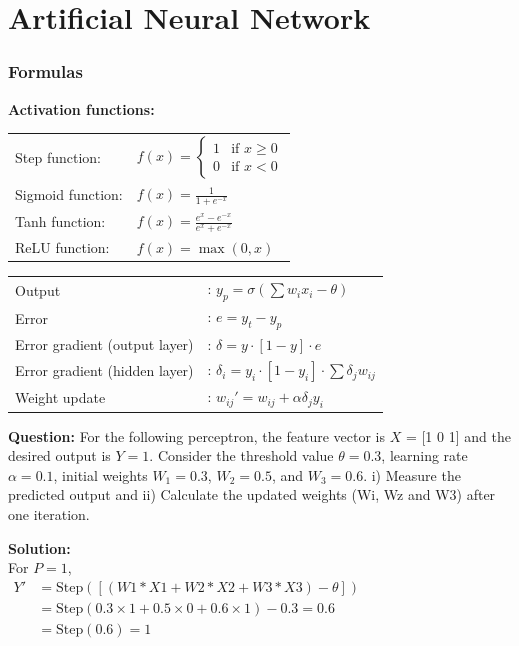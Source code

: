 \chapter{Artificial Neural Network}

\subsection*{Formulas}

\textbf{Activation functions:}\\[0.5em]
\begin{tabular}{ll}
   Step function: & $f(x) = \begin{cases} 1 & \text{if } x \geq 0 \\ 0 & \text{if } x < 0 \end{cases}$ \\[0.5em]
   Sigmoid function: & $f(x) = \frac{1}{1 + e^{-x}}$ \\[0.5em]
   Tanh function: & $f(x) = \frac{e^x - e^{-x}}{e^x + e^{-x}}$ \\[0.5em]
   ReLU function: & $f(x) = \max(0, x)$ \\[0.5em]
\end{tabular}


\begin{tabular}{ll}
   Output &: $y_p = \sigma\left(\sum w_i x_i - \theta\right)$ \\
   Error &: $e = y_t - y_p$ \\
   Error gradient (output layer) &: $\delta = y \cdot [1-y] \cdot e$ \\
   Error gradient (hidden layer) &: $\delta_i = y_i \cdot [1-y_i] \cdot \sum \delta_j w_{ij}$ \\
   Weight update &: $w_{ij}' = w_{ij} + \alpha \delta_j y_i$ \\
\end{tabular}



\vspace{1em}
\textbf{Question:} For the following perceptron, the feature vector is $X$ = [1  0  1] and the desired output is $Y=1$. Consider the threshold value $\theta = 0.3$, learning rate $\alpha = 0.1$, initial weights $W_1 = 0.3$, $W_2 = 0.5$, and $W_3 = 0.6$.
i) Measure the predicted output and
ii) Calculate the updated weights (Wi, Wz and W3) after one iteration.


\textbf{Solution:} \\[0.5em]
For $P=1$,\\[0.5em]
$\begin{aligned}
   Y' &= \text{Step}(\left[(W1*X1 + W2*X2 + W3*X3) - \theta\right])\\[0.5em]
   & = \text{Step}(0.3 \times 1 + 0.5 \times 0 + 0.6 \times 1) - 0.3 = 0.6 \\
   & = \text{Step}(0.6) = 1
\end{aligned}$

